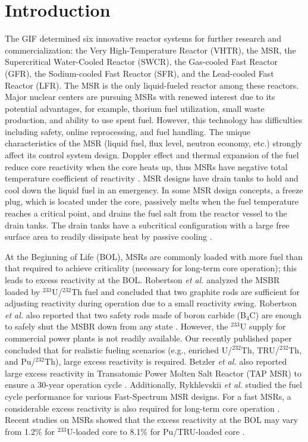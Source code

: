 \section{Introduction} \label{Introduction}

The \gls{GIF} \cite{doe2002technology} determined six innovative reactor 
systems for further research and commercialization: the Very High-Temperature Reactor (VHTR), the \gls{MSR}, the 
Supercritical Water-Cooled Reactor (SWCR), the Gas-cooled Fast Reactor (GFR), 
the Sodium-cooled Fast Reactor (SFR), and the Lead-cooled Fast Reactor (LFR). 
The MSR is the only liquid-fueled reactor among these reactors. Major nuclear 
centers are pursuing MSRs with renewed interest \cite{betzler_impacts_2019, 
ashraf2020whole}
due to its potential advantages, for example, thorium fuel utilization, small waste production, and ability to use spent fuel.
However, this technology has difficulties including safety, 
online reprocessing, and fuel handling.
The unique characteristics of the MSR (liquid fuel, flux level, neutron economy, 
etc.) strongly affect its control system design. Doppler effect and thermal expansion of the fuel reduce
core reactivity when the core heats up, thus MSRs have negative total temperature coefficient of reactivity 
\cite{nuttin2005potential}.
MSR designs have drain tanks to 
hold and cool down the liquid fuel in an emergency. In some MSR design concepts, a freeze plug, which 
is located under the core, passively melts when the fuel temperature reaches a 
critical point, and drains the fuel salt from the reactor vessel to the drain 
tanks. The drain tanks have a subcritical
configuration with a large free 
surface area to readily dissipate heat by passive cooling 
\cite{elsheikh2013safety}.

At the Beginning of Life (BOL), MSRs are commonly loaded with more
fuel than that required to achieve criticality (necessary for long-term core 
operation); this leads to excess reactivity at the BOL. Robertson \emph{et al.} analyzed the \gls{MSBR} loaded by $^{233}$U/$^{232}$Th fuel and concluded that two graphite rods are sufficient for adjusting reactivity during operation due to a small reactivity swing. Robertson \emph{et al.} also reported that two safety rods made of boron carbide (B$_4$C) are enough to safely shut the \gls{MSBR} down from any state \cite{robertson_conceptual_1971}. However, the $^{233}$U supply for commercial power plants is not readily available. Our recently published paper \cite{ashraf2020Strategies} concluded that for realistic fueling scenarios (e.g., enriched U/$^{232}$Th, TRU/$^{232}$Th, and Pu/$^{232}$Th), large excess reactivity is required. Betzler \emph{et al.} also reported large excess reactivity in Transatomic Power Molten Salt Reactor (TAP MSR) to ensure a 30-year operation cycle \cite{betzler2017assessment}. Additionally, Rykhlevskii \emph{et al.} studied the fuel cycle performance for various Fast-Spectrum \gls{MSR} designs. For a fast MSRs, a considerable excess reactivity is also required for long-term core operation \cite{rykhlevskii_fuel_2019}. Recent studies on MSRs showed that the excess reactivity 
at the BOL may vary from 1.2\% for $^{233}$U-loaded core \cite{rykhlevskii2019modeling,betzler2016modeling} to 8.1\% for Pu/TRU-loaded core \cite{ashraf2020Strategies}.

